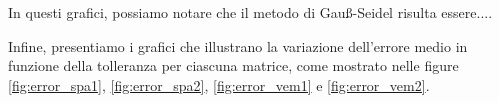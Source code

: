 
In questi grafici, possiamo notare che il metodo di Gauß-Seidel risulta essere....


Infine, presentiamo i grafici che illustrano la variazione dell'errore medio in
funzione della tolleranza per ciascuna matrice, come mostrato nelle figure \ref{fig:error_spa1},
\ref{fig:error_spa2}, \ref{fig:error_vem1} e \ref{fig:error_vem2}.


